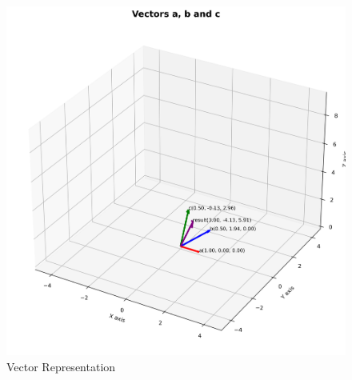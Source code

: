 \documentclass[journal]{IEEEtran}
\begin{document}
\begin{figure}[htbp]
    \centering
    \includegraphics[width=\columnwidth]{figs/fig1.png}
    \caption{Vector Representation}
    \label{fig:fig/fig1.png}
\end{figure}
\end{document}
